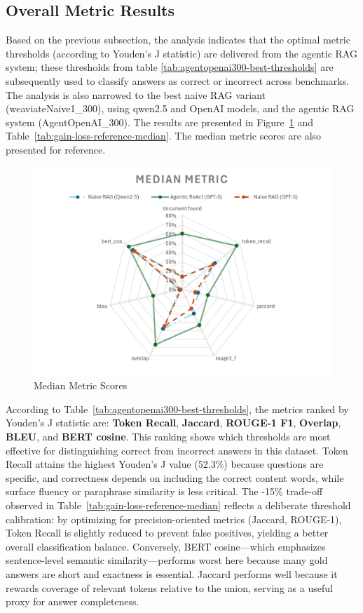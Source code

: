 \subsection{Overall Metric Results}
Based on the previous subsection, the analysis indicates that the optimal metric thresholds (according to Youden's J statistic) are delivered from the agentic RAG system; these thresholds from table \ref{tab:agentopenai300-best-thresholds} are subsequently used to classify answers as correct or incorrect across benchmarks. The analysis is also narrowed to the best naive RAG variant (weaviateNaive1\_300), using qwen2.5 and OpenAI models, and the agentic RAG system (AgentOpenAI\_300). The results are presented in Figure~\ref{fig:median-metric} and Table~\ref{tab:gain-loss-reference-median}. The median metric scores are also presented for reference.
\begin{figure}
    \centering
    \includegraphics[width=0.75\linewidth]{Figures/Median Metric.png}
    \caption{Median Metric Scores}\label{fig:median-metric}
\end{figure}
According to Table~\ref{tab:agentopenai300-best-thresholds}, the metrics ranked by Youden's J statistic are: \textbf{Token Recall}, \textbf{Jaccard}, \textbf{ROUGE-1 F1}, \textbf{Overlap}, \textbf{BLEU}, and \textbf{\gls{BERT} cosine}. This ranking shows which thresholds are most effective for distinguishing correct from incorrect answers in this dataset. Token Recall attains the highest Youden's J value (52.3\%) because questions are specific, and correctness depends on including the correct content words, while surface fluency or paraphrase similarity is less critical. The -15\% trade-off observed in Table~\ref{tab:gain-loss-reference-median} reflects a deliberate threshold calibration: by optimizing for precision-oriented metrics (Jaccard, ROUGE-1), Token Recall is slightly reduced to prevent false positives, yielding a better overall classification balance. Conversely, \gls{BERT} cosine—which emphasizes sentence-level semantic similarity—performs worst here because many gold answers are short and exactness is essential. Jaccard performs well because it rewards coverage of relevant tokens relative to the union, serving as a useful proxy for answer completeness.

